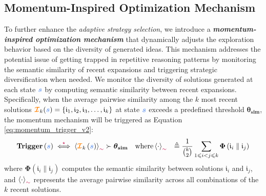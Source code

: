 \documentclass{article} %
\theoremstyle{definition}
\theoremstyle{remark}
\begin{document}
\subsection{Momentum-Inspired Optimization Mechanism}

To further enhance the \textit{adaptive strategy selection}, we introduce a \textbf{\textit{momentum-inspired optimization mechanism}} that dynamically adjusts the exploration behavior based on the diversity of generated ideas. This mechanism addresses the potential issue of getting trapped in repetitive reasoning patterns by monitoring the semantic similarity of recent expansions and triggering strategic diversification when needed. 
We monitor the diversity of solutions generated at each state $\textcolor{lightblue}{\boldsymbol{s}}$  by computing semantic similarity between recent expansions. Specifically, when the average pairwise similarity among the $k$ most recent solutions $\textcolor{orange}{\boldsymbol{\mathcal{I}}}_k(\textcolor{lightblue}{\boldsymbol{s}}) = \{\mathfrak{i}_1, \mathfrak{i}_2, \mathfrak{i}_3, \ldots, \mathfrak{i}_k\}$ at state $\textcolor{lightblue}{\boldsymbol{s}}$ exceeds a predefined threshold $\boldsymbol{\theta}_{\textbf{sim}}$, the momentum mechanism will be triggered as Equation \ref{eq:momentum_trigger_v2}:
\begin{equation}
\label{eq:momentum_trigger_v2}
\begin{aligned}
{\textbf{Trigger}}\left(\textcolor{lightblue}{\textcolor{lightblue}{\boldsymbol{s}}}\right) &\overset{{\textcolor{purple}{\star}}}{\iff} 
\left\langle \textcolor{orange}{\boldsymbol{\mathcal{I}}}_k\left(\textcolor{lightblue}{\boldsymbol{s}}\right) \right\rangle_{\textcolor{purple}{\sim}} 
\succ \boldsymbol{\theta}_{\textbf{sim}}\quad  
\text{where} \left\langle \cdot \right\rangle_{\textcolor{purple}{\sim}} &\triangleq 
\frac{1}{\binom{k}{2}} \sum_{{1 \leqslant i < j \leqslant k}} 
\boldsymbol{\Phi}\left(\mathfrak{i}_i \parallel \mathfrak{i}_j\right)
\end{aligned}
\end{equation}
where $\boldsymbol{\Phi}\left(\mathfrak{i}_i \parallel \mathfrak{i}_j\right)$ computes the semantic similarity between solutions $\mathfrak{i}_i$ and $\mathfrak{i}_j$, and $\left\langle \cdot \right\rangle_{\textcolor{purple}{\sim}}$ represents the average pairwise similarity across all combinations of the $k$ recent solutions.
\end{document}
